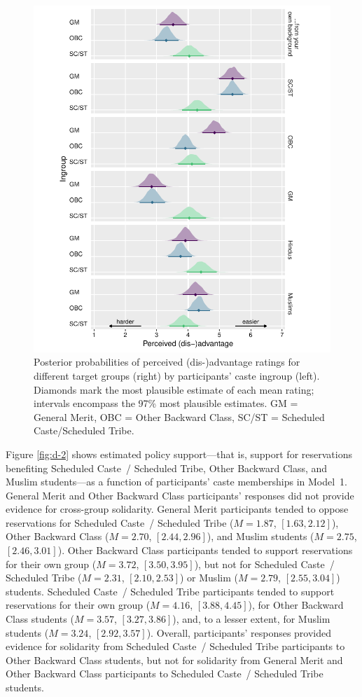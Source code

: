 \documentclass[12pt, a4paper]{article}
\begin{document}
\begin{figure}
\centering
\includegraphics[scale=1]{../figures/figure-7}
\caption{
Posterior probabilities of perceived (dis-)advantage ratings for different target groups (right) by participants' caste ingroup (left). Diamonds mark the most plausible estimate of each mean rating; intervals encompass the 97\% most plausible estimates. GM = General Merit, OBC = Other Backward Class, SC/ST = Scheduled Caste/Scheduled Tribe.
}
\label{fig:d-1}
\end{figure}

Figure \ref{fig:d-2} shows estimated policy support---that is, support for reservations benefiting Scheduled Caste~/ Scheduled Tribe, Other Backward Class, and Muslim students---as a function of participants' caste memberships in Model~1. General Merit and Other Backward Class participants' responses did not provide evidence for cross-group solidarity. General Merit participants tended to oppose reservations for Scheduled Caste~/ Scheduled Tribe ($M = 1.87$, $[1.63, 2.12]$), Other Backward Class ($M = 2.70$, $[2.44, 2.96]$), and Muslim students ($M = 2.75$, $[2.46, 3.01]$). Other Backward Class participants tended to support reservations for their own group ($M = 3.72$, $[3.50, 3.95]$), but not for Scheduled Caste~/ Scheduled Tribe ($M = 2.31$, $[2.10, 2.53]$) or Muslim ($M = 2.79$, $[2.55, 3.04]$) students. Scheduled Caste~/ Scheduled Tribe participants tended to support reservations for their own group ($M = 4.16$, $[3.88, 4.45]$), for Other Backward Class students ($M = 3.57$, $[3.27, 3.86]$), and, to a lesser extent, for Muslim students ($M = 3.24$, $[2.92, 3.57]$). Overall, participants' responses provided evidence for solidarity from Scheduled Caste~/ Scheduled Tribe participants to Other Backward Class students, but not for solidarity from General Merit and Other Backward Class participants to Scheduled Caste~/ Scheduled Tribe students. 
\end{document}
